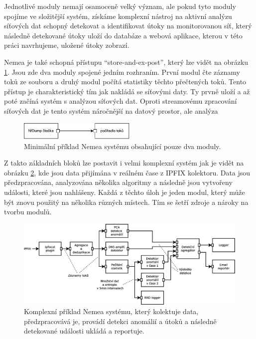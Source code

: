 Jednotlivé moduly nemají osamoceně velký význam, ale pokud tyto moduly spojíme ve složitější systém, získáme komplexní nástroj na aktivní analýzu síťových dat schopný detekovat a identifikovat útoky na monitorovanou síť, který následně detekované útoky uloží do databáze a webová aplikace, kterou v této práci navrhujeme, uložené útoky zobrazí.

Nemea je také schopná přístupu ``store-and-ex-post'', který lze vidět na obrázku \ref{fig:nemea-schema}. Jsou zde dva moduly spojené jedním rozhraním. První modul čte záznamy toků ze souboru a druhý modul počítá statistiky těchto přečtených toků. Tento přístup je charakteristický tím jak nakládá se síťovými daty. Ty prvně uloží a až poté začíná systém s analýzou síťových dat. Oproti streamovému zpracování síťových dat je tento systém náročnější na datový prostor, ale analýza 
\begin{figure}[ht]
  \centering
    \includegraphics[width=0.5\textwidth]{fig/nemea-basic.pdf}
  \caption{Minimální příklad Nemea systému obsahující pouze dva moduly.} \label{fig:nemea-schema}
  
\end{figure}

Z takto základních bloků lze postavit i velmi komplexní systém jak je vidět na obrázku \ref{fig:nemea-example-2}, kde jsou data přijímána v reálném čase z IPFIX\cite{ipfix} kolektoru. Data jsou předzpracována, analyzována několika algoritmy a následně jsou vytvořeny události, které jsou nahlášeny. Každá z těchto úloh je jeden modul, který může být znovu použitý na několika různých místech. Tím se šetří zdroje a nároky na tvorbu modulů.

\begin{figure}
  \centering
    \includegraphics[width=1\textwidth]{fig/nemea-example-2-cz.eps}
  \caption{Komplexní příklad Nemea systému, který kolektuje data, předzpracovává je, provádí detekci anomálií a útoků a následně detekované události ukládá a reportuje.} \label{fig:nemea-example-2}
  
\end{figure}


